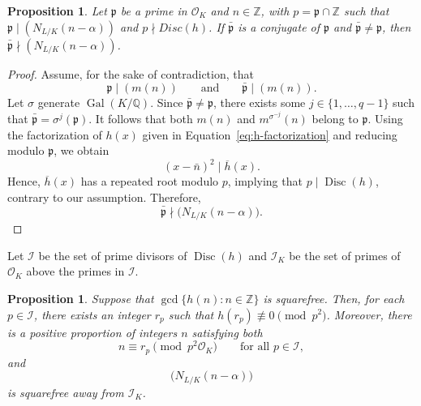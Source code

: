 \documentclass[11pt]{amsart}
\numberwithin{equation}{section}
\newtheorem{proposition}[algorithm]{Proposition}
\theoremstyle{definition}
\newcommand{\ZZ}{\mathbb{Z}}
\newcommand{\QQ}{\mathbb{Q}}
\newcommand{\cO}{\mathcal{O}}
\begin{document}
\begin{proposition}
\label{prop: conjugatenotdividing}
      Let \(\mathfrak{p}\) be a prime in $\cO_K$ and $n \in \ZZ$, with $p=\mathfrak{p}\cap \mathbb{Z}$  such that $\mathfrak{p} \mid (N_{L/K}(n - \alpha))$ and $p\nmid Disc(h)$. If $\bar{\mathfrak{p}}$ is a conjugate of $\mathfrak p$ and $\bar{\mathfrak{p}} \neq \mathfrak{p} $, then  $\bar{\mathfrak{p}} \nmid (N_{L/K}(n - \alpha))$.
\end{proposition}
\begin{proof}
    Assume, for the sake of contradiction, that
    \[
        \mathfrak{p}\mid (m(n)) \qquad\text{and}\qquad \bar{\mathfrak{p}}\mid (m(n)).
    \]
    Let \(\sigma\) generate \(\operatorname{Gal}(K/\QQ)\). Since $\bar{\mathfrak{p}}\neq\mathfrak{p}$, there exists some
    $j\in\{1,\dots,q-1\}$ such that $\bar{\mathfrak{p}}=\sigma^j(\mathfrak{p})$. It follows that both $m(n)$ and $m^{\sigma^{-j}}(n)$ belong to $\mathfrak{p}$. Using the factorization of $h(x)$ given in Equation~\ref{eq:h-factorization} and reducing modulo $\mathfrak{p}$, we obtain
    \[
        (x-\bar{n})^2\mid\overline{h}(x).
    \]
    Hence, $\overline{h}(x)$ has a repeated root modulo $p$, implying that $p\mid\operatorname{Disc}(h)$, contrary to our assumption. Therefore,
    \[
        \bar{\mathfrak{p}}\nmid\bigl(N_{L/K}(n-\alpha)\bigr).
    \]
\end{proof}

Let $\mathcal{I}$ be the set of prime divisors of $\operatorname{Disc}(h)$ and $\mathcal{I}_K$ be the set of primes of $\cO_K$ above the primes in $\mathcal{I}$.

\begin{proposition}
\label{prop: sieve}
Suppose that $\gcd\{h(n):n\in\mathbb{Z}\}$ is squarefree. Then, for each $p\in\mathcal{I}$, there exists an integer $r_p$ such that $h(r_p)\not\equiv 0\pmod{p^2}$. Moreover, there is a positive proportion of integers $n$ satisfying both
    \[
        n\equiv r_p\pmod{p^2\mathcal{O}_K}
        \qquad\text{for all }p\in\mathcal{I},
    \]
and
    \[
        \bigl(N_{L/K}(n-\alpha)\bigr)
    \]
is squarefree away from $\mathcal{I}_K$.
\end{proposition}
\end{document}

